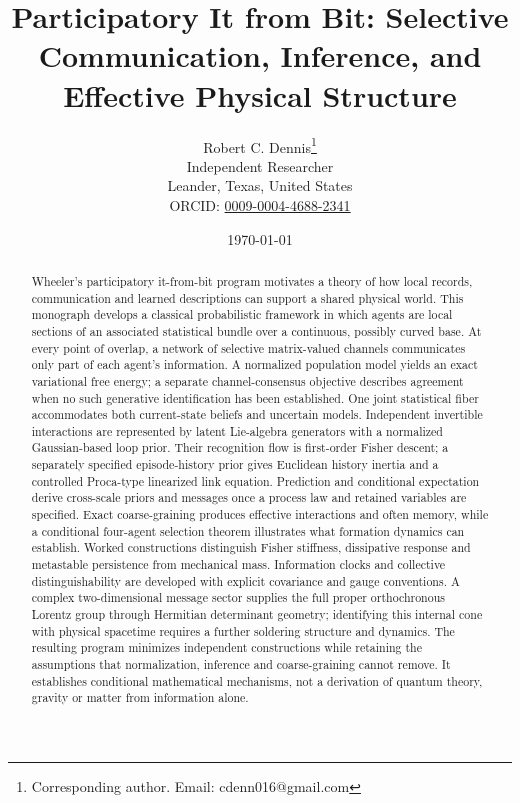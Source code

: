 \documentclass[11pt]{article}
\begin{document}
\title{Participatory It from Bit: Selective Communication, Inference, and Effective Physical Structure}

\author{
  Robert C. Dennis\thanks{Corresponding author. Email: cdenn016@gmail.com}\\[0.3cm]
  \small Independent Researcher\\
  \small Leander, Texas, United States\\[0.2cm]
  \small ORCID: \href{https://orcid.org/0009-0004-4688-2341}{0009-0004-4688-2341}
}

\date{\today}

\maketitle

\begin{abstract}
Wheeler's participatory it-from-bit program motivates a theory of how local records, communication and learned descriptions can support a shared physical world. This monograph develops a classical probabilistic framework in which agents are local sections of an associated statistical bundle over a continuous, possibly curved base. At every point of overlap, a network of selective matrix-valued channels communicates only part of each agent's information. A normalized population model yields an exact variational free energy; a separate channel-consensus objective describes agreement when no such generative identification has been established. One joint statistical fiber accommodates both current-state beliefs and uncertain models. Independent invertible interactions are represented by latent Lie-algebra generators with a normalized Gaussian-based loop prior. Their recognition flow is first-order Fisher descent; a separately specified episode-history prior gives Euclidean history inertia and a controlled Proca-type linearized link equation. Prediction and conditional expectation derive cross-scale priors and messages once a process law and retained variables are specified. Exact coarse-graining produces effective interactions and often memory, while a conditional four-agent selection theorem illustrates what formation dynamics can establish. Worked constructions distinguish Fisher stiffness, dissipative response and metastable persistence from mechanical mass. Information clocks and collective distinguishability are developed with explicit covariance and gauge conventions. A complex two-dimensional message sector supplies the full proper orthochronous Lorentz group through Hermitian determinant geometry; identifying this internal cone with physical spacetime requires a further soldering structure and dynamics. The resulting program minimizes independent constructions while retaining the assumptions that normalization, inference and coarse-graining cannot remove. It establishes conditional mathematical mechanisms, not a derivation of quantum theory, gravity or matter from information alone.
\end{abstract}
\end{document}
